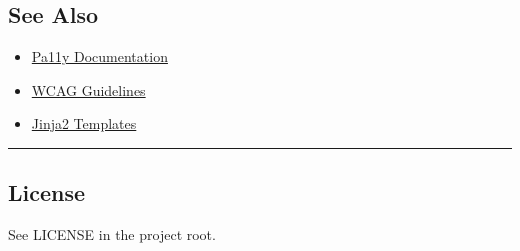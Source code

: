 \subsection{See Also}\label{see-also}

\begin{itemize}
\tightlist
\item
  \href{https://pa11y.org/}{Pa11y Documentation}
\item
  \href{https://www.w3.org/WAI/standards-guidelines/wcag/}{WCAG
  Guidelines}
\item
  \href{https://jinja.palletsprojects.com/}{Jinja2 Templates}
\end{itemize}

\begin{center}\rule{0.5\linewidth}{0.5pt}\end{center}

\subsection{License}\label{license}

See LICENSE in the project root.
